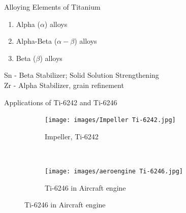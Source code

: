 \documentclass[10pt]{beamer}
\begin{document}
{%

\begin{frame}[fragile]{Alloying Elements of Titanium}

\begin{enumerate}
\item Alpha ($\alpha$) alloys
\item Alpha-Beta ($\alpha-\beta$) alloys
\item Beta ($\beta$) alloys
\end{enumerate}

Sn - Beta Stabilizer; Solid Solution Strengthening \\
Zr - Alpha Stabilizer, grain refinement
\end{frame}
}

{%
\begin{frame}[fragile]{Applications of Ti-6242 and Ti-6246}

\begin{figure}[H]
    \centering
    \begin{subfigure}{0.35\textwidth}
        \texttt{[image: images/Impeller Ti-6242.jpg]}
        \caption{Impeller, Ti-6242}
        \end{subfigure}
    ~
    \begin{subfigure}{0.45\textwidth}
        \texttt{[image: images/aeroengine Ti-6246.jpg]}
        \caption{Ti-6246 in Aircraft engine}
    \end{subfigure}
      
\end{figure}

\end{frame}
}
\end{document}
